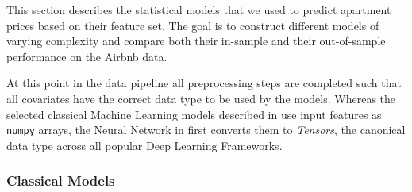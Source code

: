 This section describes the statistical models that we used to predict apartment prices based on their feature set.
The goal is to construct different models of varying complexity and compare both their in-sample and their out-of-sample performance on the Airbnb data.

At this point in the data pipeline all preprocessing steps are completed such that all covariates have the correct data type to be used by the models.
Whereas the selected classical Machine Learning models described in  use input features as \texttt{numpy} arrays, the Neural Network in  first converts them to \emph{Tensors}, the canonical data type across all popular Deep Learning Frameworks.

\subsubsection{Classical Models} \label{classical-models}

